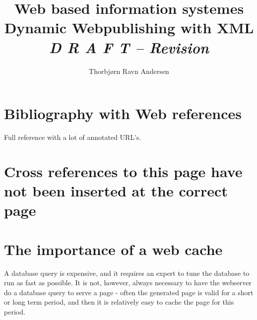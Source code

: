 \documentclass[11pt,ddraft,a4paper]{report}
\author{Thorbj{\o}rn Ravn Andersen}
\title{{\Huge \textbf{Web based information systemes}}\\
  Dynamic Webpublishing with XML\\ 
  \textit{D R A F T -- $ $Revision$ $}} %
\begin{document}


\tableofcontents
{}
\appendix


\section{Bibliography with Web references}
Full reference with a lot of annotated URL's.






\section{Cross references to this page have not been inserted at the
  correct page}

\label{sec:CGI-modperl}
\label{sec:CGI-php3}
\label{sec:CGI-servlets}
\label{sec:html-meta-tags}
\label{cha:on-demand-rendering}
\label{sec:emacs-with-psgml}
\label{sec:java-servlets}
\label{tab:mysql-examiners}
\label{fig:faqomatic-11}
\label{sec:cactus}
\label{cha:cactus}

\section{The importance of a web cache}
\label{sec:the-importance-of-a-web-cache}

A database query is expensive, and it requires an expert to tune the
database to run as fast as possible.  It is not, however, always
necessary to have the webserver do a database query to serve a page -
often the generated page is valid for a short or long term period,
and then it is relatively easy to cache the page for this period.
\end{document}
